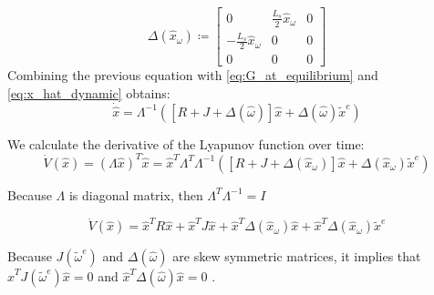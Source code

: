 \documentclass[letterpaper, 10 pt, conference]{ieeeconf}
\begin{document}
$$
\Delta(\hat{x}_{\omega})\coloneqq\left[\begin{array}{ccc}
0 & \frac{L_{s}}{2}\hat{x}_{\omega} & 0\\
-\frac{L_{s}}{2}\hat{x}_{\omega} & 0 & 0\\
0 & 0 & 0
\end{array}\right]
$$
Combining the previous equation with \eqref{eq:G_at_equilibrium} and \eqref{eq:x_hat_dynamic}
obtains: 
$$
\dot{\hat{x}}=\Lambda^{-1}\left( \left[R+J+\Delta(\hat{\omega})\right]\hat{x}+\Delta(\hat{\omega})\tilde{x}^{e}\right) 
$$

We calculate the derivative of the Lyapunov function over  time: 
$$
\dot{V}(\hat{x})=\left(\Lambda\hat{x}\right)^{T}\dot{\hat{x}}=\hat{x}^{T}\Lambda^{T}\Lambda^{-1}\left( \left[R+J+\Delta(\hat{x}_{\omega})\right]\hat{x}+\Delta(\hat{x}_{\omega})\tilde{x}^{e}\right)
$$

Because $\Lambda$ is diagonal matrix, then $\Lambda^{T}\Lambda^{-1}=I$

$$
\dot{V}(\hat{x})=\hat{x}^{T}R\hat{x}+\hat{x}^{T}J\hat{x}+\hat{x}^{T}\Delta(\hat{x}_{\omega})\hat{x}+\hat{x}^{T}\Delta(\hat{x}_{\omega})\tilde{x}^{e}
$$

Because $J(\tilde{\omega}^{e})$ and $\Delta(\hat{\omega})$ are skew
symmetric matrices, it implies that $\hat{x}^{T}J(\tilde{\omega}^{e})\hat{x}=0$
and $\hat{x}^{T}\Delta(\hat{\omega})\hat{x}=0$ .
\end{document}
